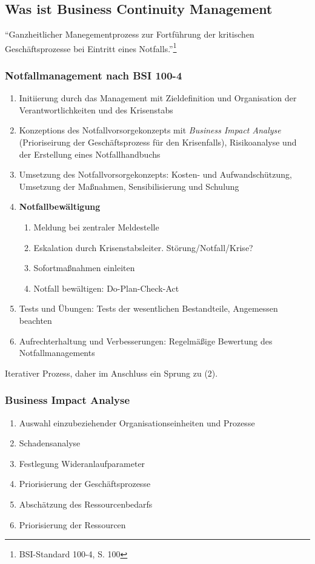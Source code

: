 \subsection{Was ist Business Continuity Management}
"`Ganzheitlicher Manegementprozess zur Fortführung der kritischen Geschäftsprozesse bei Eintritt eines Notfalls."'\footnote{BSI-Standard 100-4, S. 100}

\subsubsection{Notfallmanagement nach BSI 100-4}
\begin{enumerate}
	\item Initiierung durch das Management mit Zieldefinition und Organisation der Verantwortlichkeiten und des Krisenstabs
	\item Konzeptions des Notfallvorsorgekonzepts mit \textit{Business Impact Analyse} (Prioriseirung der Geschäftsprozess für den Krisenfalls), Risikoanalyse und der Erstellung eines Notfallhandbuchs
	\item Umsetzung des Notfallvorsorgekonzepts: Kosten- und Aufwandschützung, Umsetzung der Maßnahmen, Sensibilisierung und Schulung
	\item \textbf{Notfallbewältigung}
	\begin{enumerate}
		\item Meldung bei zentraler Meldestelle
		\item Eskalation durch Krisenstabsleiter. Störung/Notfall/Krise?
		\item Sofortmaßnahmen einleiten
		\item Notfall bewältigen: Do-Plan-Check-Act
	\end{enumerate}
	\item Tests und Übungen: Tests der wesentlichen Bestandteile, Angemessen beachten
	\item Aufrechterhaltung und Verbesserungen: Regelmäßige Bewertung des Notfallmanagements
\end{enumerate}
Iterativer Prozess, daher im Anschluss ein Sprung zu (2).

\subsubsection{Business Impact Analyse}
\begin{enumerate}
	\item Auswahl einzubeziehender Organisationseinheiten und Prozesse
	\item Schadensanalyse
	\item Festlegung Wideranlaufparameter
	\item Priorisierung der Geschäftsprozesse
	\item Abschätzung des Ressourcenbedarfs
	\item Priorisierung der Ressourcen
\end{enumerate}

